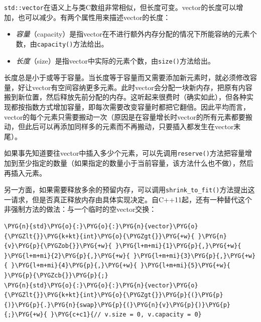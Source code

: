 
\texttt{std::\allowbreak{}vector}在语义上与类C数组非常相似，但长度可变。vector的长度可以增加，也可以减少。有两个属性用来描述vector的长度：



\begin{itemize}
\item \textit{容量}（capacity）是指vector在不进行额外内存分配的情况下所能容纳的元素个数，由\texttt{capacity()}方法给出。



\item \textit{长度}（size）是指vector中实际的元素个数，由\texttt{size()}方法给出。

\end{itemize}



长度总是小于或等于容量。当长度等于容量而又需要添加新元素时，就必须修改容量，好让vector有空间容纳更多元素。此时vector会分配一块新内存，把原有内容搬到新位置，然后释放先前分配的内存。这听起来很费时（确实如此），但各种实现都按指数方式增加容量，即每次需要改变容量时都把它翻倍。因此平均而言，vector的每个元素只需要搬动一次（原因是在容量增长时vector的所有元素都要搬动，但此后可以再添加同样多的元素而不再搬动，只要插入都发生在vector末尾）。



如果事先知道要往vector中插入多少个元素，可以先调用\texttt{reserve()}方法把容量增加到至少指定的数量（如果指定的数量小于当前容量，该方法什么也不做），然后再插入元素。



另一方面，如果需要释放多余的预留内存，可以调用\texttt{shrink\_\allowbreak{}to\_\allowbreak{}fit()}方法提出这一请求，但是否真正释放内存由具体实现决定。自C++11起，还有一种替代这个非强制方法的做法：与一个临时的空vector交换：



\begin{codeblockbg}
\begin{Verbatim}[commandchars=\\\{\},breaklines=true,breakanywhere=true,fontsize=\codefont,xleftmargin=17bp]
\PYG{n}{std}\PYG{o}{:}\PYG{o}{:}\PYG{n}{vector}\PYG{o}{\PYGZlt{}}\PYG{k+kt}{int}\PYG{o}{\PYGZgt{}}\PYG{+w}{ }\PYG{n}{v}\PYG{p}{\PYGZob{}}\PYG{+w}{ }\PYG{l+m+mi}{1}\PYG{p}{,}\PYG{+w}{ }\PYG{l+m+mi}{2}\PYG{p}{,}\PYG{+w}{ }\PYG{l+m+mi}{3}\PYG{p}{,}\PYG{+w}{ }\PYG{l+m+mi}{4}\PYG{p}{,}\PYG{+w}{ }\PYG{l+m+mi}{5}\PYG{+w}{ }\PYG{p}{\PYGZcb{}}\PYG{p}{;}
\PYG{n}{std}\PYG{o}{:}\PYG{o}{:}\PYG{n}{vector}\PYG{o}{\PYGZlt{}}\PYG{k+kt}{int}\PYG{o}{\PYGZgt{}}\PYG{p}{(}\PYG{p}{)}\PYG{p}{.}\PYG{n}{swap}\PYG{p}{(}\PYG{n}{v}\PYG{p}{)}\PYG{p}{;}\PYG{+w}{ }\PYG{c+c1}{// v.size = 0, v.capacity = 0}
\end{Verbatim}
\end{codeblockbg}


